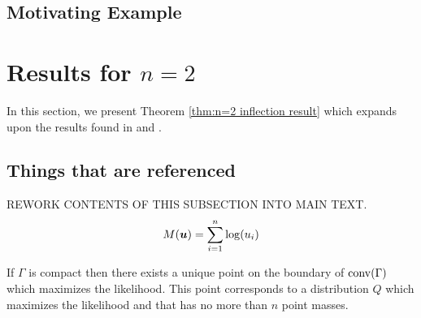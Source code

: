 	\subsection{Motivating Example}

\section{Results for \texorpdfstring{$n = 2$}{n = 2}}
	In this section, we present Theorem \ref{thm:n=2 inflection result} which 
	expands upon the results found in \cite{Lindsay1983-tf} and \cite{Lindsay1983a-he}.

	\subsection{Things that are referenced}
	REWORK CONTENTS OF THIS SUBSECTION INTO MAIN TEXT.
	\begin{equation}
		M({\bm{{u}}}) = \sum_{i=1}^n \log(u_i)
		\label{eq:transformedlikelihood}
	\end{equation}

	\begin{theorem}
		If $\Gamma$ is compact then there exists a unique point on the boundary of $\mathrm{conv}(\Gamma)$ which maximizes the likelihood. This point corresponds to a distribution $Q$ which maximizes the likelihood and that has no more than $n$ point masses.
		\label{thm:LindsayGamma}
	\end{theorem}

	

